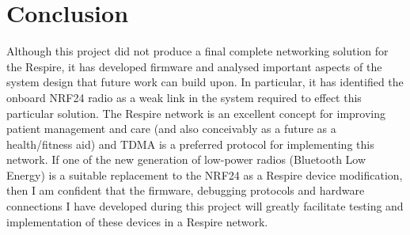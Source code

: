 
\chapter{Conclusion}

Although this project did not produce a final complete networking solution for the Respire, it has
developed firmware and analysed important aspects of the system design that future work can build
upon. In particular, it has identified the onboard \ac{NRF24} radio as a weak link in the system required
to effect this particular solution. The Respire network is an excellent concept for improving patient
management and care (and also conceivably as a future as a health/fitness aid) and \ac{TDMA} is a
preferred protocol for implementing this network. If one of the new generation of low-power radios
(\eg Bluetooth Low Energy) is a suitable replacement to the \ac{NRF24} as a Respire device
modification, then I am confident that the firmware, debugging protocols and hardware connections
I have developed during this project will greatly facilitate testing and implementation of these
devices in a Respire network.

